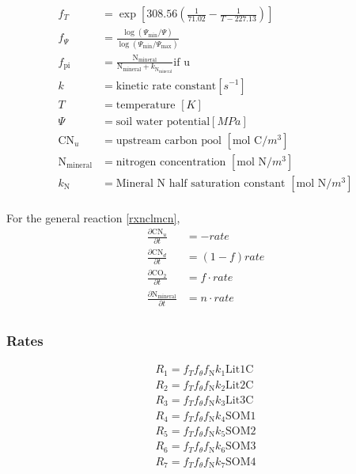 \documentclass[12pt, a4paper]{article}
\begin{document}
\begin{align*}
f_T & = \exp\left[308.56 \left(\frac{1}{71.02}-\frac{1}{T - 227.13}\right)\right]\\
f_\Psi & = \frac{\log\left(\Psi_\text{min}/\Psi\right)}{\log\left(\Psi_\text{min}/\Psi_\text{max}\right)}\\
f_\text{pi} & = \frac{\text{N}_\text{mineral}}{\text{N}_\text{mineral} + k_{\text{N}_\text{mineral}}} \text{if u } \\
k & = \text{kinetic rate constant} [s^{-1}]\\
T & = \text{temperature } [K] \\
\Psi & = \text{soil water potential} [MPa] \\
\text{CN}_u & = \text{upstream carbon pool } [\text{mol C}/m^3] \\
\text{N}_\text{mineral} & = \text{nitrogen concentration } [\text{mol N}/m^3] \\
k_\text{N} & = \text{Mineral N half saturation constant } [\text{mol N}/m^3]\\
\end{align*}

For the general reaction \ref{rxnclmcn}, 
\begin{align*}
\frac{\partial \text{CN}_u}{\partial t} & = -rate \\
\frac{\partial \text{CN}_d}{\partial t} & = \left(1-f\right) rate \\
\frac{\partial \text{CO}_2}{\partial t} & = f \cdot rate \\
\frac{\partial \text{N}_\text{mineral}}{\partial t} & = n \cdot rate \\
\end{align*}

\subsubsection{Rates}
\begin{align*}
R_1 = f_T f_\theta f_\text{N} k_1 \text{Lit1C} \\
R_2 = f_T f_\theta f_\text{N} k_2 \text{Lit2C} \\
R_3 = f_T f_\theta f_\text{N} k_3 \text{Lit3C} \\
R_4 = f_T f_\theta f_\text{N} k_4 \text{SOM1} \\
R_5 = f_T f_\theta f_\text{N} k_5 \text{SOM2} \\
R_6 = f_T f_\theta f_\text{N} k_6 \text{SOM3} \\
R_7 = f_T f_\theta f_\text{N} k_7 \text{SOM4}
\end{align*}
\end{document}
